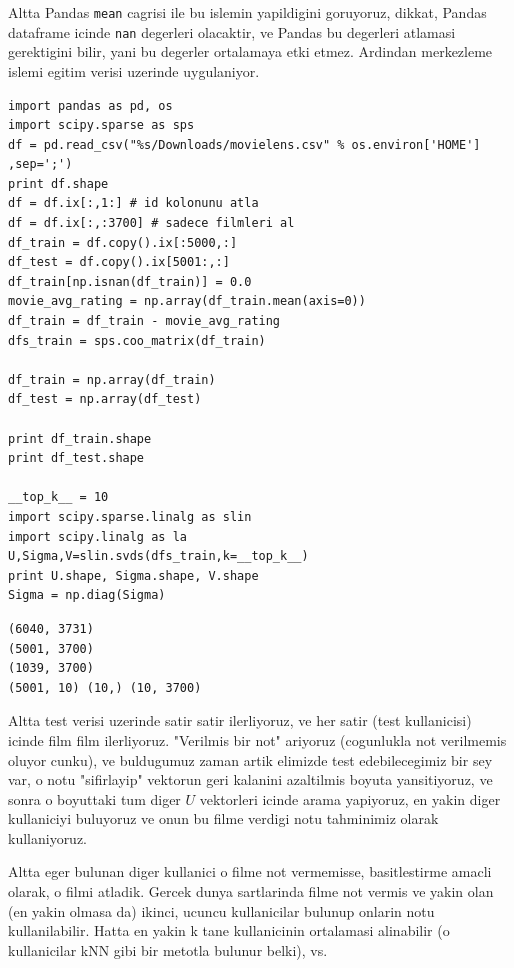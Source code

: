 \documentclass[12pt,fleqn]{article}\usepackage{../common}
\begin{document}
Altta Pandas \verb!mean! cagrisi ile bu islemin yapildigini
goruyoruz, dikkat, Pandas dataframe icinde \verb!nan! degerleri
olacaktir, ve Pandas bu degerleri atlamasi gerektigini bilir, yani bu
degerler ortalamaya etki etmez. Ardindan merkezleme islemi egitim
verisi uzerinde uygulaniyor.

\begin{verbatim}
import pandas as pd, os
import scipy.sparse as sps
df = pd.read_csv("%s/Downloads/movielens.csv" % os.environ['HOME'] ,sep=';')
print df.shape
df = df.ix[:,1:] # id kolonunu atla
df = df.ix[:,:3700] # sadece filmleri al
df_train = df.copy().ix[:5000,:]
df_test = df.copy().ix[5001:,:]
df_train[np.isnan(df_train)] = 0.0
movie_avg_rating = np.array(df_train.mean(axis=0))
df_train = df_train - movie_avg_rating
dfs_train = sps.coo_matrix(df_train)

df_train = np.array(df_train)
df_test = np.array(df_test)

print df_train.shape
print df_test.shape

__top_k__ = 10
import scipy.sparse.linalg as slin
import scipy.linalg as la
U,Sigma,V=slin.svds(dfs_train,k=__top_k__)
print U.shape, Sigma.shape, V.shape
Sigma = np.diag(Sigma)
\end{verbatim}

\begin{verbatim}
(6040, 3731)
(5001, 3700)
(1039, 3700)
(5001, 10) (10,) (10, 3700)
\end{verbatim}

Altta test verisi uzerinde satir satir ilerliyoruz, ve her satir (test
kullanicisi) icinde film film ilerliyoruz. "Verilmis bir not" ariyoruz
(cogunlukla not verilmemis oluyor cunku), ve buldugumuz zaman artik
elimizde test edebilecegimiz bir sey var, o notu "sifirlayip" vektorun
geri kalanini azaltilmis boyuta yansitiyoruz, ve sonra o boyuttaki tum
diger $U$ vektorleri icinde arama yapiyoruz, en yakin diger
kullaniciyi buluyoruz ve onun bu filme verdigi notu tahminimiz olarak
kullaniyoruz.

Altta eger bulunan diger kullanici o filme not vermemisse, basitlestirme
amacli olarak, o filmi atladik. Gercek dunya sartlarinda filme not vermis
ve yakin olan (en yakin olmasa da) ikinci, ucuncu kullanicilar bulunup
onlarin notu kullanilabilir. Hatta en yakin k tane kullanicinin ortalamasi
alinabilir (o kullanicilar kNN gibi bir metotla bulunur belki), vs.
\end{document}
